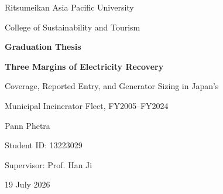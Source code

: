 \documentclass[12pt,letterpaper]{article}
\begin{document}

\begin{titlepage}
\thispagestyle{empty}
\begin{center}
\vspace*{1.2cm}
{\Large Ritsumeikan Asia Pacific University\par}
\vspace{0.35cm}
{\large College of Sustainability and Tourism\par}
\vspace{1.1cm}
{\Large\bfseries Graduation Thesis\par}

\vfill

{\LARGE\bfseries Three Margins of Electricity Recovery\par}
\vspace{0.45cm}
{\Large Coverage, Reported Entry, and Generator Sizing in Japan's\par}
\vspace{0.15cm}
{\Large Municipal Incinerator Fleet, FY2005--FY2024\par}

\vfill

{\large Pann Phetra\par}
\vspace{0.4cm}
{\large Student ID: 13223029\par}
\vspace{0.4cm}
{\large Supervisor: Prof. Han Ji\par}

\vfill

{\large 19 July 2026\par}
\end{center}
\end{titlepage}

\clearpage
{}
\end{document}
